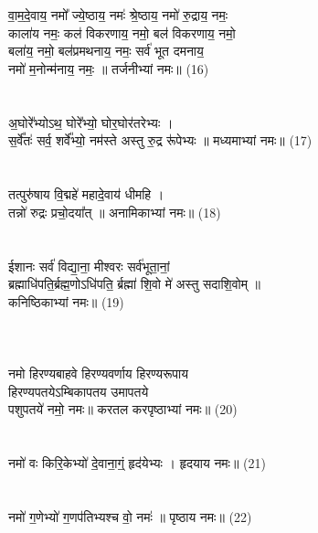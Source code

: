 {\small{}}\\
\\
वा॒म॒दे॒वाय॒ नमो᳚ ज्ये॒ष्ठाय॒ नमः॑ श्रे॒ष्ठाय॒ नमो॑ रु॒द्राय॒ नमः॒ \\
काला॑य नमः॒ कल॑ विकरणाय॒ नमो॒ बल॑ विकरणाय॒ नमो॒\\
बला॑य॒ नमो॒ बल॑प्रमथनाय॒ नमः॒ सर्व॑ भूत दमनाय॒ \\
नमो॑ म॒नोन्म॑नाय॒ नमः॒ ॥ तर्जनीभ्यां नमः॥ (16)\\
{\small{}}\\
\\
अ॒घोरे᳚भ्योऽथ॒ घोरे᳚भ्यो॒ घोर॒घोर॑तरेभ्यः । \\
स॒र्वे᳚तः॑ सर्व॒ शर्वे᳚भ्यो॒ नम॑स्ते अस्तु रु॒द्र रू॑पेभ्यः ॥ मध्यमाभ्यां नमः॥ (17)\\
{\small{}}\\
\\
तत्पुरु॑षाय वि॒द्महे॑ महादे॒वाय॑ धीमहि । \\
तन्नो॑ रुद्रः प्रचो॒दया᳚त् ॥ अनामिकाभ्यां नमः॥ (18)\\
{\small{}}\\
\\
ईशानः सर्व॑ विद्या॒ना॒ मीश्वरः सर्व॑भूता॒नां॒\\
ब्रह्माधि॑पति॒र्ब्रह्म॒णोऽधि॑पति॒ र्ब्रह्मा॑ शि॒वो मे॑ अस्तु सदाशि॒वोम् ॥\\
कनिष्ठिकाभ्यां नमः॥ (19)\\
{\small{}}\\
\\
{\small{}}\\
नमो हिरण्यबाहवे हिरण्यवर्णाय हिरण्यरूपाय \\
हिरण्यपतयेऽम्बिकापतय उमापतये\\
पशुपतये॑ नमो॒ नमः॥ करतल करपृष्ठाभ्यां नमः॥ (20)\\
{\small{}}\\
\\
नमो॑ वः किरि॒केभ्यो॑ दे॒वाना॒ग्ं॒ हृद॑येभ्यः । हृदयाय नमः॥ (21)\\
{\small{}}\\
\\
नमो॑ ग॒णेभ्यो॑ ग॒णप॑तिभ्यश्च वो॒ नमः॑ ॥ पृष्ठाय नमः॥ (22)\\
{\small{}}\\
